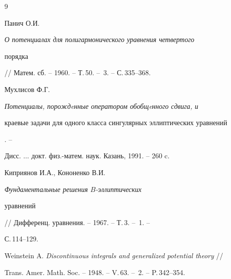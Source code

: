 \begin{thebibliography}{9}







Панич О.И. {\it О потенциалах для полигармонического уравнения четвертого 


порядка} // Матем. сб. -- 1960. -- Т.\,50. -- \No\,3. -- С.\,335--368.




Мухлисов Ф.Г. {\it Потенциалы, порождeнные оператором обобщeнного сдвига, и


краевые задачи для одного класса сингулярных эллиптических уравнений}. --


Дисс. $\dotsc$ докт. физ.-матем. наук. Казань, 1991. -- 260 c.




Киприянов И.А., Кононенко В.И. {\it Фундаментальные решения $B$-эллиптических 


уравнений} // Дифференц. уравнения. -- 1967. -- Т.\,3. -- \No\,1. -- 


С.\,114--129.




Weinstein A. {\it Discontinuous integrals and generalized potential theory} //


Trans. Amer. Math. Soc. -- 1948. -- V.\,63. -- \No\,2. -- P.\,342--354.





\end{thebibliography}





\vskip 2cm












\label{end}





